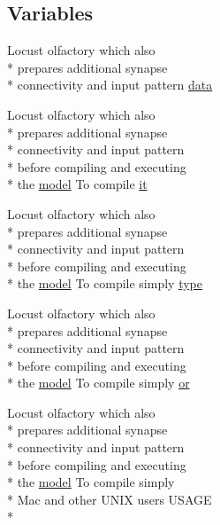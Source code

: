 \subsection*{Variables}
\begin{DoxyCompactItemize}
\item 
Locust olfactory which also \\*
prepares additional synapse \\*
connectivity and input pattern \hyperlink{userproject_2MBody1__project_2README_8txt_a061ab0b3ed4015ddc94b25da6fabc3ed}{data}
\item 
Locust olfactory which also \\*
prepares additional synapse \\*
connectivity and input pattern \\*
before compiling and executing \\*
the \hyperlink{README_8txt_a69fd801b7213948c12d9dd7eebb3ed14}{model} To compile \hyperlink{userproject_2MBody1__project_2README_8txt_a0f5e77768a9d48a2402aa5fa820e7f32}{it}
\item 
Locust olfactory which also \\*
prepares additional synapse \\*
connectivity and input pattern \\*
before compiling and executing \\*
the \hyperlink{README_8txt_a69fd801b7213948c12d9dd7eebb3ed14}{model} To compile simply \hyperlink{userproject_2MBody1__project_2README_8txt_a01ddd328249dc8dd3d89a7bd34ff048e}{type}
\item 
Locust olfactory which also \\*
prepares additional synapse \\*
connectivity and input pattern \\*
before compiling and executing \\*
the \hyperlink{README_8txt_a69fd801b7213948c12d9dd7eebb3ed14}{model} To compile simply \hyperlink{userproject_2MBody1__project_2README_8txt_abe668cd749436216a416616a79152d9d}{or}
\item 
Locust olfactory which also \\*
prepares additional synapse \\*
connectivity and input pattern \\*
before compiling and executing \\*
the \hyperlink{README_8txt_a69fd801b7213948c12d9dd7eebb3ed14}{model} To compile simply \\*
Mac and other U\+N\+I\+X users U\+S\+A\+G\+E \\*

\end{DoxyCompactItemize}
